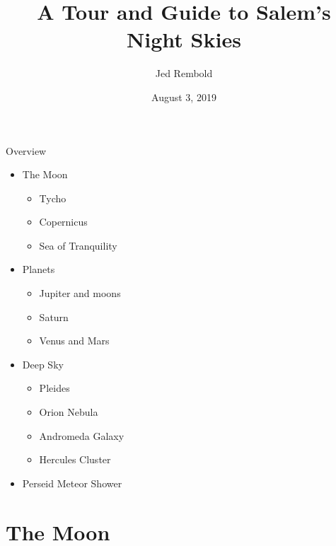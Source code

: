 \documentclass[pdf, ]{beamer}
\title{A Tour and Guide to Salem's Night Skies}
\author{Jed Rembold}
\date{August 3, 2019}
\begin{document}
\renewcommand{\theenumi}{\Alph{enumi}}

{
	\maketitle
}

\begin{frame}{Overview}
	\begin{itemize}
		\item The Moon
			\begin{itemize}
				\item Tycho
				\item Copernicus
				\item Sea of Tranquility
			\end{itemize}
		\item Planets
			\begin{itemize}
				\item Jupiter and moons
				\item Saturn
				\item Venus and Mars
			\end{itemize}
		\item Deep Sky
			\begin{itemize}
				\item Pleides
				\item Orion Nebula
				\item Andromeda Galaxy
				\item Hercules Cluster
			\end{itemize}
		\item Perseid Meteor Shower
	\end{itemize}
\end{frame}

\section{The Moon}
\end{document}

